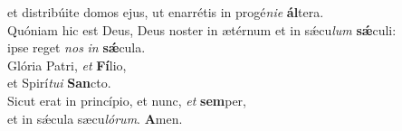 \evenverse et distribúite domos ejus, ut enarrétis in progé\textit{ni}\textit{e} \textbf{ál}tera.\\
\oddverse Quóniam hic est Deus, Deus noster in ætérnum et in sǽcu\textit{lum} \textbf{sǽ}culi:~\*\\
\oddverse ipse reget \textit{nos} \textit{in} \textbf{sǽ}cula.\\
\evenverse Glória Patri, \textit{et} \textbf{Fí}lio,~\*\\
\evenverse et Spirí\textit{tu}\textit{i} \textbf{San}cto.\\
\oddverse Sicut erat in princípio, et nunc, \textit{et} \textbf{sem}per,~\*\\
\oddverse et in sǽcula sæcu\textit{ló}\textit{rum}. \textbf{A}men.\\
